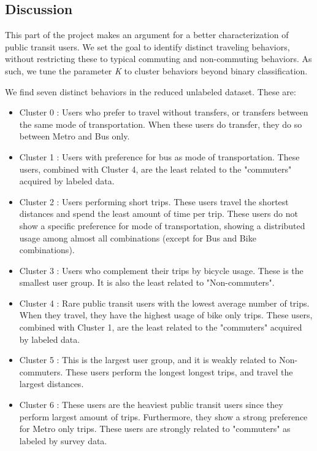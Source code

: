 \documentclass{article}
\begin{document}
\subsection{Discussion}
This part of the project makes an argument for a better characterization of public transit users. We set the goal to identify distinct traveling behaviors, without restricting these to typical commuting and non-commuting behaviors. As such, we tune the parameter \textit{K} to cluster behaviors beyond binary classification. 

We find seven distinct behaviors in the reduced unlabeled dataset. These are:

\begin{itemize}

\item Cluster 0 : Users who prefer to travel without transfers, or transfers between the same mode of transportation. When these users do transfer, they do so between Metro and Bus only.

\item Cluster 1 : Users with preference for bus as mode of transportation. These users, combined with Cluster 4, are the least related to the "commuters" acquired by labeled data.

\item Cluster 2 : Users performing short trips. These users travel the shortest distances and spend the least amount of time per trip. These users do not show a specific preference for mode of transportation, showing a distributed usage among almost all combinations (except for Bus and Bike combinations).

\item Cluster 3 : Users who complement their trips by bicycle usage. These is the smallest user group. It is also the least related to "Non-commuters".

\item Cluster 4 : Rare public transit users with the lowest average number of trips. When they travel, they have the highest usage of bike only trips. These users, combined with Cluster 1, are the least related to the "commuters" acquired by labeled data.

\item Cluster 5 : This is the largest user group, and it is weakly related to Non-commuters. These users perform the longest longest trips, and travel the largest distances.

\item Cluster 6 : These users are the heaviest public transit users since they perform largest amount of trips. Furthermore, they show a strong preference for Metro only trips. These users are strongly related to "commuters" as labeled by survey data. 

\end{itemize}
\end{document}
